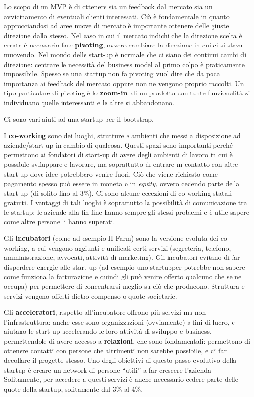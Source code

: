 \begin{enumerate}
 Lo scopo di un MVP è di ottenere sia un feedback dal mercato sia
 un avvicinamento di eventuali clienti interessati. Ciò è fondamentale in
 quanto approcciandosi ad aree nuove di mercato è importante ottenere delle
 giuste direzione dallo stesso. Nel caso in cui il mercato indichi che la
 direzione scelta è errata è necessario fare \textbf{pivoting},
 ovvero cambiare la direzione in cui ci si stava muovendo. Nel mondo delle
 start-up è normale che ci siano dei continui cambi di direzione: centrare le
 necessità del business model al primo colpo è praticamente impossibile. Spesso
 se una startup non fa pivoting vuol dire che da poca importanza ai feedback
 del mercato oppure non ne vengono proprio raccolti. Un tipo particolare di
 pivoting è lo \textbf{zoom-in}: di un prodotto con tante funzionalità si
 individuano quelle interessanti e le altre si abbandonano.

 Ci sono vari aiuti ad una startup per il bootstrap.

 I \textbf{co-working} sono dei luoghi, strutture e ambienti che messi a
 disposizione ad aziende/start-up in cambio di qualcosa.
 Questi spazi sono importanti perché permettono ai fondatori di start-up di
 avere degli ambienti di lavoro in cui è possibile sviluppare e lavorare, ma
 soprattutto di entrare in contatto con altre start-up dove idee potrebbero
 venire  fuori. Ciò che viene richiesto come pagamento spesso può essere in
 moneta o in  \textit{equity}, ovvero cedendo parte della start-up (di solito
 fino al 3\%). Ci sono alcune eccezioni di co-working statali gratuiti. I
 vantaggi di tali  luoghi è soprattutto la possibilità di comunicazione tra le
 startup: le aziende alla fin fine hanno sempre gli stessi problemi e è utile
 sapere come altre persone li hanno superati.

 Gli \textbf{incubatori} (come ad esempio H-Farm) sono la versione evoluta dei
 co-working, a cui vengono aggiunti e unificati certi servizi (segreteria,
 telefono, amministrazione, avvocati, attività di marketing). Gli incubatori
 evitano di far disperdere energie alle start-up (ad esempio uno startupper
 potrebbe non sapere come funziona la fatturazione e quindi gli può venire
 offerto qualcuno che se ne occupa) per permettere di concentrarsi meglio su
 ciò che producono. Struttura e servizi vengono offerti dietro compenso o quote
 societarie.

 Gli \textbf{acceleratori}, rispetto all'incubatore offrono più servizi ma non
 l'infrastruttura: anche esse sono organizzazioni (ovviamente) a fini di lucro,
 e aiutano le start-up accelerando le loro attività di sviluppo e business,
 permettendole di avere accesso a \textbf{relazioni}, che sono fondamentali:
 permettono di ottenere contatti con persone che altrimenti non sarebbe
 possibile, e di far decollare il progetto stesso. Uno degli obiettivi di
 questo passo evolutivo della startup è creare un network di persone ``utili''
 a far crescere l'azienda. Solitamente, per accedere a questi servizi è anche
 necessario cedere parte delle quote della startup, solitamente dal 3\% al 4\%.


\end{enumerate}
